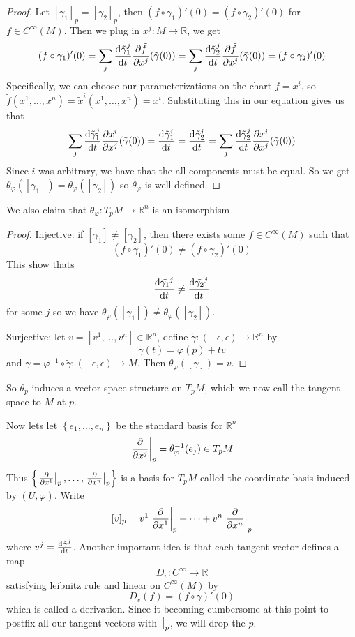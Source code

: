\documentclass[a4paper]{article}
\begin{document}
\begin{proof}
    Let $[\gamma_1]_p = [\gamma_2]_p$, then $(f \circ \gamma_1)'(0) = (f \circ \gamma_2)'(0)$ for $f \in C^{\infty}(M)$. Then we plug in $x^j: M \rightarrow \mathds{R}$, we get
    \[
      (f \circ \gamma_1)'(0) = \sum_j \dv[]{\tilde{\gamma}^j_1}{t}(0) \frac{\partial \tilde{f}}{\partial x^j}(\tilde{\gamma}(0))  = \sum_j \dv{\tilde{\gamma}^j_2}{t}(0) \frac{\partial \tilde{f}}{\partial x^j}(\tilde{\gamma}(0)) = (f \circ \gamma_2)'(0)
    \]
    Specifically, we can choose our parameterizations on the chart $f = x^i$, so $\tilde{f}(x^1, \dots, x^n) = \tilde{x}^i(x^1, \dots, x^n) = x^i$. Substituting this in our equation gives us that
    \[
      \sum_j \dv{\tilde{\gamma}^j_1}{t}(0) \frac{\partial x^i}{\partial x^j}(\tilde{\gamma}(0)) = \dv[]{\tilde{\gamma}^i_1}{t} = \dv[]{\tilde{\gamma}^i_2}{t} = \sum_j \dv{\tilde{\gamma}^j_2}{t}(0) \frac{\partial x^i}{\partial x^j}(\tilde{\gamma}(0))
    \]
    Since $i$ was arbitrary, we have that the all components must be equal. So we get $\theta_{\varphi}([\gamma_1]) = \theta_{\varphi}([\gamma_2])$ so $\theta_\varphi$ is well defined.
\end{proof}
We also claim that $\theta_{\varphi}: T_pM \rightarrow \mathds{R}^n$ is an isomorphism
\begin{proof}
    Injective: if $[\gamma_1] \neq [\gamma_2]$, then there exists some $f \in C^{\infty}(M)$ such that 
    \[
        (f \circ \gamma_1)'(0) \neq (f \circ \gamma_2)'(0)
    \]
    This show thats 
    \[
      \dv{\tilde{\gamma_1}^j}{t}(0) \neq \dv{\tilde{\gamma_2}^j}{t}
    \]
    for some $j$ so we have $\theta_{\varphi}([\gamma_1]) \neq \theta_{\varphi}([\gamma_2])$.

    Surjective: let $v = [v^1, \dots, v^n] \in \mathds{R}^n$, define $\tilde{\gamma}:(-\epsilon, \epsilon) \rightarrow \mathds{R}^n$ by 
    \[
        \tilde{\gamma}(t) = \varphi(p) + tv
    \]
    and $\gamma = \varphi^{-1} \circ \tilde{\gamma}: (-\epsilon, \epsilon) \rightarrow M$. Then $\theta_{\varphi}([\gamma]) = v$.
\end{proof}
So $\theta_p$ induces a vector space structure on $T_pM$, which we now call the tangent space to $M$ at $p$.

Now lets let $ \left\{ e_1, \dots, e_n \right\}$ be the standard basis for $\mathds{R}^n$
\[
  \eval{\pdv{}{x^j}}_p = \theta_{\varphi}^{-1}(e_j) \in T_pM
\]
Thus $\left\{ \eval{\pdv{}{x^1}}_p, \dots, \eval{\pdv{}{x^n}}_p\right\}$ is a basis for $T_pM$ called the coordinate basis induced by $(U, \varphi)$.
Write
\[
    [v]_p = v^1 \eval{\pdv{}{x^1}}_p + \dots + v^n \eval{\pdv{}{x^n}}_p
\]
where $v^j = \dv[]{\tilde{\gamma}^j}{t}$. Another important idea is that each tangent vector defines a map
\[
    D_v: C^{\infty} \rightarrow \mathds{R}
\]
satisfying leibnitz rule and linear on $C^{\infty}(M)$ by 
\[
    D_v(f) = (f \circ \gamma)'(0)
\]
which is called a derivation. Since it becoming cumbersome at this point to postfix all our tangent vectors with $\eval{}_p$, we will drop the $p$.
\end{document}
